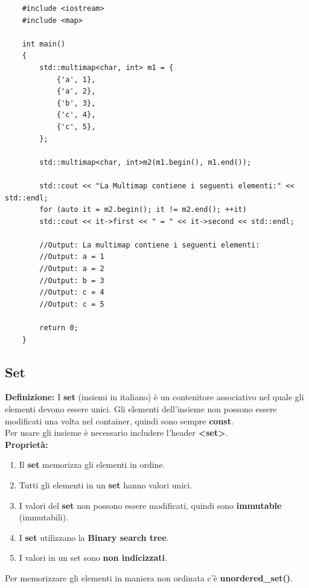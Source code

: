 \begin{lstlisting}
	#include <iostream>
	#include <map>
	
	int main()
	{
		std::multimap<char, int> m1 = {
			{'a', 1},
			{'a', 2},
			{'b', 3},
			{'c', 4},
			{'c', 5},
		};
		
		std::multimap<char, int>m2(m1.begin(), m1.end());
		
		std::cout << "La Multimap contiene i seguenti elementi:" << std::endl;
		for (auto it = m2.begin(); it != m2.end(); ++it)
		std::cout << it->first << " = " << it->second << std::endl;
		
		//Output: La multimap contiene i seguenti elementi: 
		//Output: a = 1
		//Output: a = 2
		//Output: b = 3
		//Output: c = 4
		//Output: c = 5
		
		return 0;
	}
\end{lstlisting}

\subsection{Set}

\textsf{\small \textbf{Definizione: } I \textbf{set} (insiemi in italiano) è un contenitore associativo nel quale gli elementi devono essere unici. Gli elementi dell'insieme non possono essere modificati una volta nel container, quindi sono sempre \textbf{const}.} \\

\textsf{\small Per usare gli insieme è necessario includere l'header \textbf{<set>}.} \\

\textbf{Proprietà: } \\

\begin{enumerate}
	\item \textsf{\small Il \textbf{set} memorizza gli elementi in ordine.}
	\item \textsf{\small Tutti gli elementi in un \textbf{set} hanno valori unici.}
	\item \textsf{\small I valori del \textbf{set} non possono essere modificati, quindi sono \textbf{immutable} (immutabili).}
	\item \textsf{\small I \textbf{set} utilizzano la \textbf{Binary search tree}.}
	\item \textsf{\small I valori in un set sono \textbf{non indicizzati}.}
\end{enumerate}

\textsf{\small Per memorizzare gli elementi in maniera non ordinata c'è \textbf{unordered\_set()}.} \\

